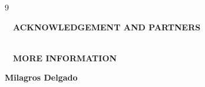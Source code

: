 \documentclass[
portrait,
a0paper%
]
{baposter}
\begin{document}
\begin{poster}
{\begin{minipage}[t][3.6cm]{.32\textwidth}
\begin{thebibliography}{9}
\begin{tiny}
	  \end{tiny}
	\end{thebibliography} 
  \end{minipage}
  \hfill\vline\hfill
  \begin{minipage}[t][3.6cm]{.32\textwidth}
	\vspace{.3cm}
	$\quad$\textbf{\small\color{cernblue}ACKNOWLEDGEMENT AND PARTNERS}\\$\;$\\
	\footnotesize
	\begin{minipage}{.32\textwidth}
	  \begin{center}
	  \end{center}
	\end{minipage}
	\begin{minipage}{.32\textwidth}
	  \begin{center}
	  \end{center}
	\end{minipage}
	\begin{minipage}{.32\textwidth}
	  \begin{center}
	  \end{center}
	\end{minipage}
    \vspace*{-0.5cm}
  \end{minipage}
  \hfill\vline\hfill
  \begin{minipage}[t][3.6cm]{.32\textwidth}
  \vspace{0.3cm}
  $\quad$\textbf{\small\color{cernblue}MORE INFORMATION} \vspace{0.15cm}\\ 
	\begin{minipage}{.35\textwidth}
	  \begin{center}
	  \end{center}
	\end{minipage}
	\begin{minipage}{.64\textwidth} 
    \vspace{.3cm}
	  \color{cernblue}
	  \footnotesize
	  \textbf{Milagros Delgado}\\

\end{minipage}
\end{minipage}}
\end{poster}
\end{document}
